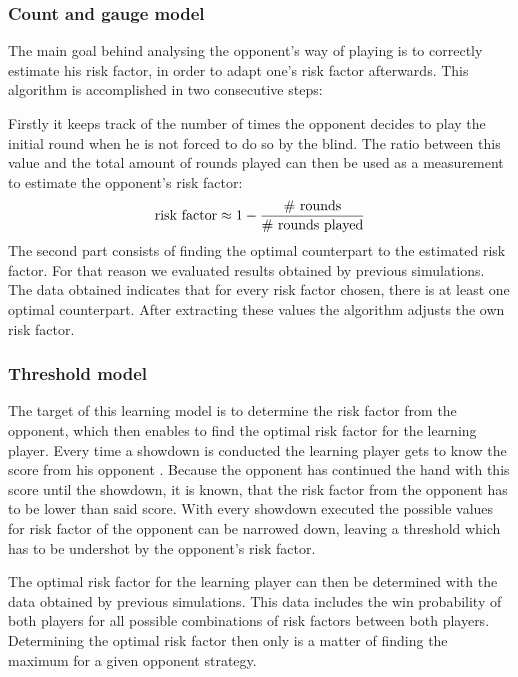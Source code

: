 \documentclass[11pt]{article}
\begin{document}
\subsubsection{Count and gauge model}

The main goal behind analysing the opponent's way of playing is to correctly estimate his risk factor, in order to adapt one's risk factor afterwards. 
This algorithm is accomplished in two consecutive steps:
 
Firstly it keeps track of the number of times the opponent decides to play the initial round when he is not forced to do so by the blind. The ratio between this value and the total amount of rounds played can then be used as a measurement to estimate the opponent's risk factor:
 $$
\textnormal{risk factor} \approx 1 - \dfrac{\textnormal{\# rounds}}{\textnormal{\# rounds played}}
 $$
The second part consists of finding the optimal counterpart to the estimated risk factor. For that reason we evaluated results obtained by previous simulations. The data obtained indicates that for every risk factor chosen, there is at least one optimal counterpart. After extracting these values the algorithm adjusts the own risk factor.

 

\subsubsection{Threshold model}

The target of this learning model is to determine the risk factor from the opponent, which then enables to find the optimal risk factor for the learning player.
Every time a showdown is conducted the learning player gets to know the score from his opponent . Because the opponent has continued the hand with this score until the showdown, it is known, that the risk factor from the opponent has to be lower than said score. With every showdown executed the possible values for risk factor of the opponent can be narrowed down, leaving a threshold which has to be undershot by the opponent's risk factor.


The optimal risk factor for the learning player can then be determined with the data obtained by previous simulations. This data includes the win probability of both players for all possible combinations of risk factors between both players. Determining the optimal risk factor then only is a matter of finding the maximum for a given opponent strategy.
\end{document}
